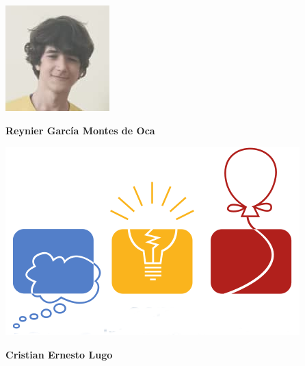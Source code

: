 \begin{minipage}{0.2\textwidth}
	\includegraphics[width=\linewidth]{img/concursantes/reynier.png} %
\end{minipage}
\hfill
\begin{minipage}{0.7\textwidth}
	\textbf{Reynier García Montes de Oca}
	
\end{minipage}

\begin{minipage}{0.2\textwidth}
	\includegraphics[width=\linewidth]{img/icpc.png} %
\end{minipage}
\hfill
\begin{minipage}{0.7\textwidth}
	\textbf{Cristian Ernesto Lugo}
	
\end{minipage}

